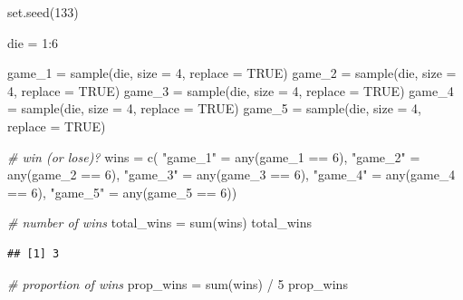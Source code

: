 \documentclass[
]{book}
\newenvironment{Shaded}{\begin{snugshade}}{\end{snugshade}}
\newcommand{\AttributeTok}[1]{\textcolor[rgb]{0.77,0.63,0.00}{#1}}
\newcommand{\CommentTok}[1]{\textcolor[rgb]{0.56,0.35,0.01}{\textit{#1}}}
\newcommand{\ConstantTok}[1]{\textcolor[rgb]{0.00,0.00,0.00}{#1}}
\newcommand{\DecValTok}[1]{\textcolor[rgb]{0.00,0.00,0.81}{#1}}
\newcommand{\FunctionTok}[1]{\textcolor[rgb]{0.00,0.00,0.00}{#1}}
\newcommand{\NormalTok}[1]{#1}
\newcommand{\OtherTok}[1]{\textcolor[rgb]{0.56,0.35,0.01}{#1}}
\newcommand{\SpecialCharTok}[1]{\textcolor[rgb]{0.00,0.00,0.00}{#1}}
\newcommand{\StringTok}[1]{\textcolor[rgb]{0.31,0.60,0.02}{#1}}
\begin{document}
\begin{Shaded}
\begin{Highlighting}[]
\FunctionTok{set.seed}\NormalTok{(}\DecValTok{133}\NormalTok{)}

\NormalTok{die }\OtherTok{=} \DecValTok{1}\SpecialCharTok{:}\DecValTok{6}

\NormalTok{game\_1 }\OtherTok{=} \FunctionTok{sample}\NormalTok{(die, }\AttributeTok{size =} \DecValTok{4}\NormalTok{, }\AttributeTok{replace =} \ConstantTok{TRUE}\NormalTok{)}
\NormalTok{game\_2 }\OtherTok{=} \FunctionTok{sample}\NormalTok{(die, }\AttributeTok{size =} \DecValTok{4}\NormalTok{, }\AttributeTok{replace =} \ConstantTok{TRUE}\NormalTok{)}
\NormalTok{game\_3 }\OtherTok{=} \FunctionTok{sample}\NormalTok{(die, }\AttributeTok{size =} \DecValTok{4}\NormalTok{, }\AttributeTok{replace =} \ConstantTok{TRUE}\NormalTok{)}
\NormalTok{game\_4 }\OtherTok{=} \FunctionTok{sample}\NormalTok{(die, }\AttributeTok{size =} \DecValTok{4}\NormalTok{, }\AttributeTok{replace =} \ConstantTok{TRUE}\NormalTok{)}
\NormalTok{game\_5 }\OtherTok{=} \FunctionTok{sample}\NormalTok{(die, }\AttributeTok{size =} \DecValTok{4}\NormalTok{, }\AttributeTok{replace =} \ConstantTok{TRUE}\NormalTok{)}

\CommentTok{\# win (or lose)?}
\NormalTok{wins }\OtherTok{=} \FunctionTok{c}\NormalTok{(}
  \StringTok{"game\_1"} \OtherTok{=} \FunctionTok{any}\NormalTok{(game\_1 }\SpecialCharTok{==} \DecValTok{6}\NormalTok{),}
  \StringTok{"game\_2"} \OtherTok{=} \FunctionTok{any}\NormalTok{(game\_2 }\SpecialCharTok{==} \DecValTok{6}\NormalTok{),}
  \StringTok{"game\_3"} \OtherTok{=} \FunctionTok{any}\NormalTok{(game\_3 }\SpecialCharTok{==} \DecValTok{6}\NormalTok{),}
  \StringTok{"game\_4"} \OtherTok{=} \FunctionTok{any}\NormalTok{(game\_4 }\SpecialCharTok{==} \DecValTok{6}\NormalTok{),}
  \StringTok{"game\_5"} \OtherTok{=} \FunctionTok{any}\NormalTok{(game\_5 }\SpecialCharTok{==} \DecValTok{6}\NormalTok{))}
  
\CommentTok{\# number of wins}
\NormalTok{total\_wins }\OtherTok{=} \FunctionTok{sum}\NormalTok{(wins)}
\NormalTok{total\_wins}
\end{Highlighting}
\end{Shaded}

\begin{verbatim}
## [1] 3
\end{verbatim}

\begin{Shaded}
\begin{Highlighting}[]
\CommentTok{\# proportion of wins}
\NormalTok{prop\_wins }\OtherTok{=} \FunctionTok{sum}\NormalTok{(wins) }\SpecialCharTok{/} \DecValTok{5}
\NormalTok{prop\_wins}
\end{Highlighting}
\end{Shaded}
\end{document}
